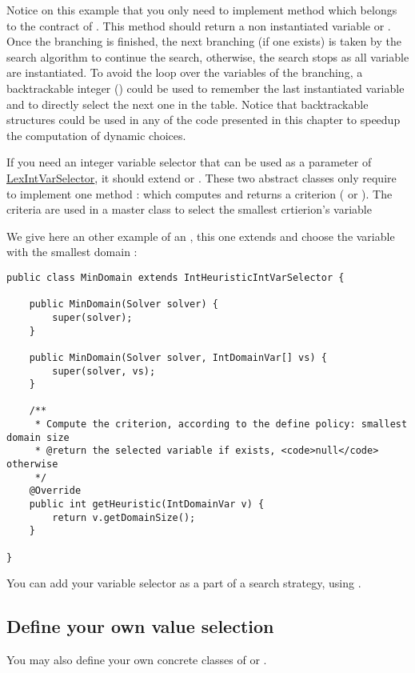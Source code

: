 Notice on this example that you only need to implement method  which belongs to the contract of . This method should return a non instantiated variable or . Once the branching is finished, the next branching (if one exists) is taken by the search algorithm to continue the search, otherwise, the search stops as all variable are instantiated. To avoid the loop over the variables of the branching, a backtrackable integer () could be used to remember the last instantiated variable and to directly select the next one in the table. Notice that backtrackable structures could be used in any of the code presented in this chapter to speedup the computation of dynamic choices.


If you need an integer variable selector that can be used as a parameter of \hyperlink{lexintvarselector:lexintvarselectorvarselector}{LexIntVarSelector}, it should extend  or . These two abstract classes only require to implement one method :  which computes and returns a criterion ( or ). The criteria are used in a master class to select the smallest crtierion's variable 

We give here an other example of an , this one extends  and choose the variable with the smallest domain :
\begin{lstlisting}
public class MinDomain extends IntHeuristicIntVarSelector {

	public MinDomain(Solver solver) {
		super(solver);
	}

	public MinDomain(Solver solver, IntDomainVar[] vs) {
		super(solver, vs);
	}

    /**
     * Compute the criterion, according to the define policy: smallest domain size
     * @return the selected variable if exists, <code>null</code> otherwise
     */
	@Override
	public int getHeuristic(IntDomainVar v) {
		return v.getDomainSize();
	}

}
\end{lstlisting}


You can add your variable selector as a part of a search strategy, using .

\subsection{Define your own value selection}\label{advanced:defineyourownvalueselection}\hypertarget{advanced:defineyourownvalueselection}{}
You may also define your own concrete classes of  or . 

